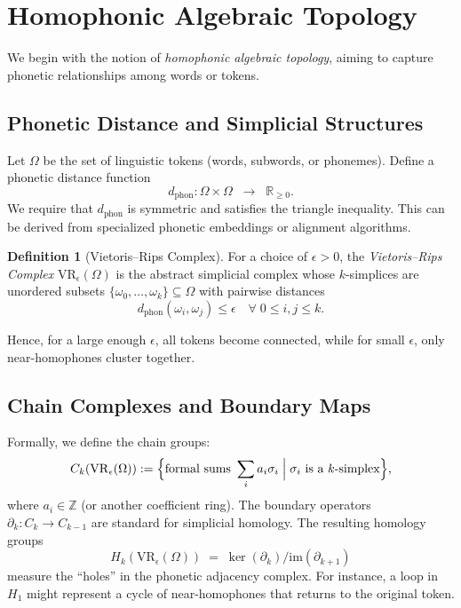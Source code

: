 \documentclass[11pt]{article}
\theoremstyle{definition}
\newtheorem{definition}[theorem]{Definition}
\theoremstyle{remark}
\begin{document}
\section{Homophonic Algebraic Topology}
\label{sec:homophonic-algebraic-topology}
We begin with the notion of \emph{homophonic algebraic topology}, aiming to capture phonetic relationships among words or tokens.

\subsection{Phonetic Distance and Simplicial Structures}
Let \(\Omega\) be the set of linguistic tokens (words, subwords, or phonemes). Define a phonetic distance function
\[
d_{\mathrm{phon}}: \Omega \times \Omega \;\; \to \;\; \mathbb{R}_{\ge 0}.
\]
We require that \(d_{\mathrm{phon}}\) is symmetric and satisfies the triangle inequality. This can be derived from specialized phonetic embeddings or alignment algorithms.

\begin{definition}[Vietoris–Rips Complex]
For a choice of \(\epsilon > 0\), the \emph{Vietoris–Rips Complex} \(\mathrm{VR}_\epsilon(\Omega)\) is the abstract simplicial complex whose \(k\)-simplices are unordered subsets \(\{\omega_0,\dots,\omega_k\}\subseteq \Omega\) with pairwise distances
\[
d_{\mathrm{phon}}(\omega_i, \omega_j) \le \epsilon \quad \forall \; 0 \le i,j \le k.
\]
\end{definition}

Hence, for a large enough \(\epsilon\), all tokens become connected, while for small \(\epsilon\), only near-homophones cluster together.

\subsection{Chain Complexes and Boundary Maps}
Formally, we define the chain groups:
\[
C_k(\mathrm{VR}_\epsilon(\Omega)) := \Bigl\{ \text{formal sums } \sum_i a_i \sigma_i \;\Big|\; \sigma_i \text{ is a }k\text{-simplex} \Bigr\},
\]
where \(a_i \in \mathbb{Z}\) (or another coefficient ring). The boundary operators \(\partial_k: C_k \to C_{k-1}\) are standard for simplicial homology. The resulting homology groups
\[
H_k(\mathrm{VR}_\epsilon(\Omega)) \;=\; \ker(\partial_k) / \mathrm{im}(\partial_{k+1})
\]
measure the “holes” in the phonetic adjacency complex. For instance, a loop in \(H_1\) might represent a cycle of near-homophones that returns to the original token.
\end{document}
